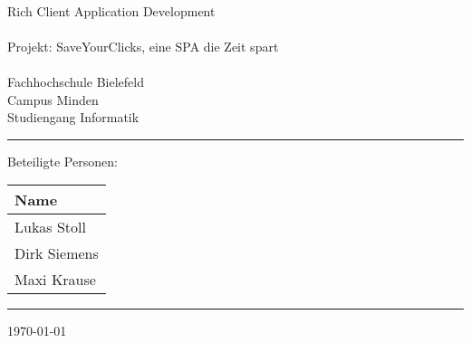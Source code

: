 


\begin{titlepage}
   \mbox{}\vspace{5\baselineskip}\\
   \sffamily\huge
   \centering
   {\Huge Rich Client Application Development } \\
    \vspace{2\baselineskip}\\
  Projekt:  SaveYourClicks, eine SPA die Zeit spart\\
   \vspace{2\baselineskip}\\
   \rmfamily\Large
  Fachhochschule Bielefeld \\
  Campus Minden \\
  Studiengang Informatik
   \vspace{2\baselineskip}\\
\noindent\rule{15cm}{0.4pt}
Beteiligte Personen:
\begin{table}[H]
	\tablestyle
	\begin{tabular}{*{1}{v{0.45\textwidth}}}
		\hline
		\textbf{Name} \tabularnewline
		\hline
		Lukas Stoll \tabularnewline
		Dirk Siemens\tabularnewline
		Maxi Krause \tabularnewline

	\end{tabular}
\end{table}

\centering
\noindent\rule{15cm}{0.4pt}
%
%		
   \today
\end{titlepage}

